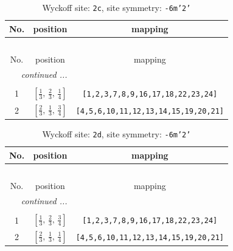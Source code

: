 \documentclass[fleqn,8pt]{jsarticle}
\begin{document}
\renewcommand{\arraystretch}{1.2}
\begin{longtable}{ccc}
\caption{Wyckoff site: {\tt 2c}, site symmetry: {\tt -6m'2'}}
 \\
 \hline \hline
No. & position & mapping \\ \hline \endfirsthead

\multicolumn{2}{l}{\tablename\ \thetable{}} \\
 \hline \hline
No. & position & mapping \\ \hline \endhead

 \hline \hline
\multicolumn{2}{r}{\footnotesize\it continued ...} \\ \endfoot

 \hline \hline
\multicolumn{2}{r}{} \\ \endlastfoot

1 & $\left[ \frac{1}{3},\, \frac{2}{3},\, \frac{1}{4} \right]$ & {\tt [1,2,3,7,8,9,16,17,18,22,23,24]} \\ \hline
2 & $\left[ \frac{2}{3},\, \frac{1}{3},\, \frac{3}{4} \right]$ & {\tt [4,5,6,10,11,12,13,14,15,19,20,21]} \\
\end{longtable}
\renewcommand{\arraystretch}{1.2}
\begin{longtable}{ccc}
\caption{Wyckoff site: {\tt 2d}, site symmetry: {\tt -6m'2'}}
 \\
 \hline \hline
No. & position & mapping \\ \hline \endfirsthead

\multicolumn{2}{l}{\tablename\ \thetable{}} \\
 \hline \hline
No. & position & mapping \\ \hline \endhead

 \hline \hline
\multicolumn{2}{r}{\footnotesize\it continued ...} \\ \endfoot

 \hline \hline
\multicolumn{2}{r}{} \\ \endlastfoot

1 & $\left[ \frac{1}{3},\, \frac{2}{3},\, \frac{3}{4} \right]$ & {\tt [1,2,3,7,8,9,16,17,18,22,23,24]} \\ \hline
2 & $\left[ \frac{2}{3},\, \frac{1}{3},\, \frac{1}{4} \right]$ & {\tt [4,5,6,10,11,12,13,14,15,19,20,21]} \\
\end{longtable}
\renewcommand{\arraystretch}{1.2}
\end{document}
